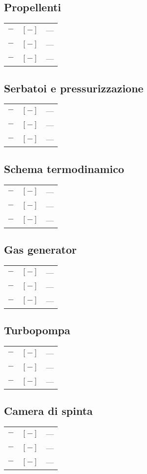 \begin{multicols}{2}
	\subsection{Propellenti}
	\begin{tabular}{ccl}
		$\bm{-}$ & $[-]$ & --- \\
		$\bm{-}$ & $[-]$ & --- \\
		$\bm{-}$ & $[-]$ & ---
	\end{tabular}

	\subsection{Serbatoi e pressurizzazione}
	\begin{tabular}{ccl}
		$\bm{-}$ & $[-]$ & --- \\
		$\bm{-}$ & $[-]$ & --- \\
		$\bm{-}$ & $[-]$ & ---
	\end{tabular}

	\subsection{Schema termodinamico}
	\begin{tabular}{ccl}
		$\bm{-}$ & $[-]$ & --- \\
		$\bm{-}$ & $[-]$ & --- \\
		$\bm{-}$ & $[-]$ & ---
	\end{tabular}

	\subsection{Gas generator}
	\begin{tabular}{ccl}
		$\bm{-}$ & $[-]$ & --- \\
		$\bm{-}$ & $[-]$ & --- \\
		$\bm{-}$ & $[-]$ & ---
	\end{tabular}
	
	\subsection{Turbopompa}
	\begin{tabular}{ccl}
		$\bm{-}$ & $[-]$ & --- \\
		$\bm{-}$ & $[-]$ & --- \\
		$\bm{-}$ & $[-]$ & ---
	\end{tabular}

	\subsection{Camera di spinta}
	\begin{tabular}{ccl}
		$\bm{-}$ & $[-]$ & --- \\
		$\bm{-}$ & $[-]$ & --- \\
		$\bm{-}$ & $[-]$ & ---
	\end{tabular}
	

\end{multicols}

